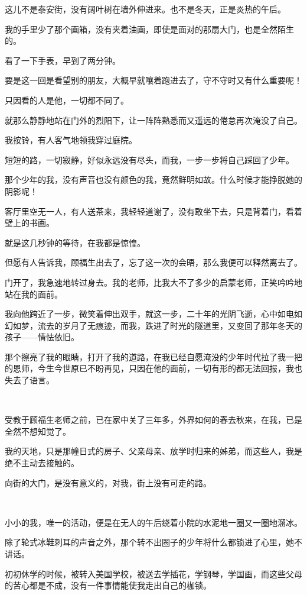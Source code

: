 \par 这儿不是泰安街，没有阔叶树在墙外伸进来。也不是冬天，正是炎热的午后。
\par 我的手里少了那个画箱，没有夹着油画，即使是面对的那扇大门，也是全然陌生的。
\par 看了一下手表，早到了两分钟。
\par 要是这一回是看望别的朋友，大概早就嚷着跑进去了，守不守时又有什么重要呢！
\par 只因看的人是他，一切都不同了。
\par 就那么静静地站在门外的烈阳下，让一阵阵熟悉而又遥远的倦怠再次淹没了自己。
\par 我按铃，有人客气地领我穿过庭院。
\par 短短的路，一切寂静，好似永远没有尽头，而我，一步一步将自己踩回了少年。
\par 那个少年的我，没有声音也没有颜色的我，竟然鲜明如故。什么时候才能挣脱她的阴影呢！
\par 客厅里空无一人，有人送茶来，我轻轻道谢了，没有敢坐下去，只是背着门，看着壁上的书画。
\par 就是这几秒钟的等待，在我都是惊惶。
\par 但愿有人告诉我，顾福生出去了，忘了这一次的会晤，那么我便可以释然离去了。
\par 门开了，我急速地转过身去。我的老师，比我大不了多少的启蒙老师，正笑吟吟地站在我的面前。
\par 我向他跨近了一步，微笑着伸出双手，就这一步，二十年的光阴飞逝，心中如电如幻如梦，流去的岁月了无痕迹，而我，跌进了时光的隧道里，又变回了那年冬天的孩子——情怯依旧。
\par 那个擦亮了我的眼睛，打开了我的道路，在我已经自愿淹没的少年时代拉了我一把的恩师，今生今世原已不盼再见，只因在他的面前，一切有形的都无法回报，我也失去了语言。
\par  
\par 受教于顾福生老师之前，已在家中关了三年多，外界如何的春去秋来，在我，已是全然不想知觉了。
\par 我的天地，只是那幢日式的房子、父亲母亲、放学时归来的姊弟，而这些人，我是绝不主动去接触的。
\par 向街的大门，是没有意义的，对我，街上没有可走的路。
\par  
\par 小小的我，唯一的活动，便是在无人的午后绕着小院的水泥地一圈又一圈地溜冰。
\par 除了轮式冰鞋刺耳的声音之外，那个转不出圈子的少年将什么都锁进了心里，她不讲话。
\par 初初休学的时候，被转入美国学校，被送去学插花，学钢琴，学国画，而这些父母的苦心都是不成，没有一件事情能使我走出自己的枷锁。

